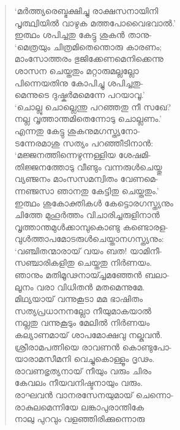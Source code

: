 \begin{verse}
‘മര്‍ത്ത്യരെബ്ഭക്ഷിച്ചു രാക്ഷസനായിനി\\
പൃത്ഥ്വിയില്‍ വാഴുക മത്തപോവൈഭവാല്‍.’\\
ഇത്ഥം ശപിച്ചതു കേട്ടു ശുകന്‍ താനു-\\
‘മെത്രയും ചിത്രമിതെന്തൊരു കാരണം;\\
മാംസോത്തരം ഭുജിക്കേണമെനിക്കെന്നു\\
ശാസന ചെയ്തതും മറ്റാരുമല്ലല്ലോ\\
പിന്നെയതിനു കോപിച്ചു ശപിച്ചതു-\\
മെന്നുടെ ദുഷ്കര്‍മമെന്നേ പറയാവൂ.’\\
‘ചൊല്ലു ചൊല്ലെന്തു പറഞ്ഞതു നീ സഖേ?\\
നല്ല വൃത്താന്തമിതെന്നോടു ചൊല്ലണം.’\\
എന്നതു കേട്ടു ശുകനുമഗസ്ത്യനോ-\\
ടന്നേരമാശു സത്യം പറഞ്ഞീടിനാന്‍:\\
‘മജ്ജനത്തിന്നെഴുന്നള്ളിയ ശേഷമി-\\
തിജ്ജനത്തോടു വീണ്ടും വന്നരുള്‍ചെയ്തു\\
വ്യഞ്ജനം മാംസസമന്വിതം വേണമെ-\\
ന്നഞ്ജസാ ഞാനതു കേട്ടിതു ചെയ്തതും.’\\
ഇത്ഥം ശുകോക്തികള്‍ കേട്ടൊരഗസ്ത്യനും\\
ചിത്തേ മുഹൂര്‍ത്തം വിചാരിച്ചരുളിനാന്‍\\
വൃത്താന്തമുള്‍ക്കാമ്പുകൊണ്ടു കണ്ടൊരള-\\
വുള്‍ത്താപമോടരുള്‍ചെയ്താനഗസ്ത്യനും:\\
‘വഞ്ചിതന്മാരായ് വയം ബത! യാമിനീ-\\
സഞ്ചാരികളിതു ചെയ്തതു നിര്‍ണയം.\\
ഞാനും മതിമൂഢനായ്ച്ചമഞ്ഞേന്‍ ബലാ-\\
ലൂനം വരാ വിധിതന്‍ മതമെന്നുമേ.\\
മിഥ്യയായ് വന്നുകൂടാ മമ ഭാഷിതം\\
സത്യപ്രധാനനല്ലോ നീയുമാകയാല്‍\\
നല്ലതു വന്നുകൂടും മേലില്‍ നിര്‍ണയം\\
കല്യാണമായ് ശാപമോക്ഷവു നല്കുവന്‍.\\
ശ്രീരാമപത്നിയെ രാവണന്‍ കൊണ്ടുപോ-\\
യാരാമസീമനി വെച്ചുകൊള്ളൂം ദൃഢം.\\
രാവണഭൃത്യനായ് നീയും വരും ചിരം\\
കേവലം നീയവനിഷ്ടനായും വരും.\\
രാഘവന്‍ വാനരസേനയുമായ് ചെന്നൊ-\\
രാകുലമെന്നിയേ ലങ്കാപുരാന്തികേ\\
നാലു പുറവും വളഞ്ഞിരിക്കുന്നൊരു\\

\end{verse}
